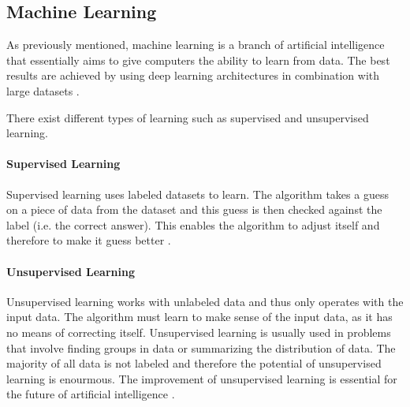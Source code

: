 \subsection{Machine Learning}
\label{subsec:ml}

As previously mentioned, machine learning is a branch of artificial intelligence that essentially aims to give computers the ability to learn from data.
The best results are achieved by using deep learning architectures in combination with large datasets \cite{ai_machine_learning}.

There exist different types of learning such as supervised and unsupervised learning.

\paragraph{Supervised Learning}
Supervised learning uses labeled datasets to learn.
The algorithm takes a guess on a piece of data from the dataset and this guess is then checked against the label (i.e. the correct answer).
This enables the algorithm to adjust itself and therefore to make it guess better \cite{supervised_learning}.

\paragraph{Unsupervised Learning}
Unsupervised learning works with unlabeled data and thus only operates with the input data.
The algorithm must learn to make sense of the input data, as it has no means of correcting itself.
Unsupervised learning is usually used in problems that involve finding groups in data or summarizing the distribution of data.
The majority of all data is not labeled and therefore the potential of unsupervised learning is enourmous.
The improvement of unsupervised learning is essential for the future of artificial intelligence \cite{unsupervised_learning}.
